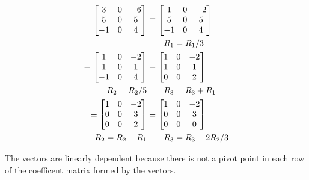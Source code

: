 \documentclass{../mathhomework}
\newenvironment{Mat}{\begin{bmatrix}}{\end{bmatrix}}
\begin{document}
\begin{problem}[1.7\#17]
    \begin{solution}
        \begin{align*}
            \begin{Mat}
                3 & 0 & -6 \\ 
                5 & 0 & 5 \\ 
                -1 & 0 & 4 \\
            \end{Mat}
            & \equiv \begin{Mat}
                1 & 0 & -2 \\ 
                5 & 0 & 5 \\ 
                -1 & 0 & 4 \\
            \end{Mat}
            \\ 
            & \qquad{} R_1 = R_1/3 \\ 
            \equiv \begin{Mat}
                1 & 0 & -2 \\ 
                1 & 0 & 1 \\ 
                -1 & 0 & 4 \\
            \end{Mat}
            & \equiv \begin{Mat}
                1 & 0 & -2 \\ 
                1 & 0 & 1 \\ 
                0 & 0 & 2 \\
            \end{Mat}
            \\ 
            R_2 = R_2/5 & \qquad{} R_3 = R_3 + R_1 \\
            \equiv \begin{Mat}
                1 & 0 & -2 \\ 
                0 & 0 & 3 \\ 
                0 & 0 & 2 \\
            \end{Mat}
            & \equiv \begin{Mat}
                1 & 0 & -2 \\ 
                0 & 0 & 3 \\ 
                0 & 0 & 0 \\
            \end{Mat}
            \\
            R_2 = R_2 - R_1 & \qquad{} R_3 = R_3 - 2R_2/3
        \end{align*}

        The vectors are linearly dependent because there is not a pivot point in each row of the coefficent matrix formed by the vectors.
    \end{solution}
\end{problem}
\end{document}

